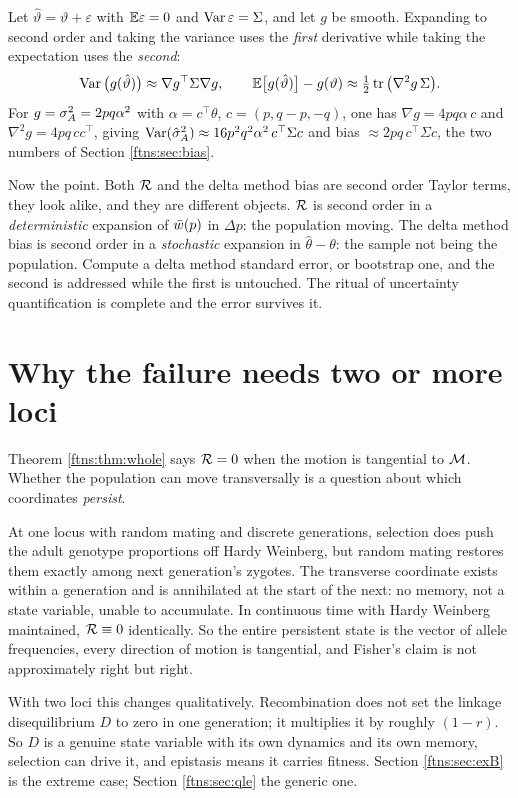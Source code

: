 Let $\hat\vartheta=\vartheta+\varepsilon$ with $\mathbb{E}\varepsilon=0$ and $\operatorname{Var}\varepsilon=\Sigma$, and let
$g$ be smooth. Expanding to second order and taking the variance uses the \emph{first} derivative
while taking the expectation uses the \emph{second}:
\[
\operatorname{Var}\big(g(\hat\vartheta)\big)\approx\nabla g^\top \Sigma\nabla g,
\qquad
\mathbb{E}\big[g(\hat\vartheta)\big]-g(\vartheta)\approx\tfrac12\operatorname{tr}\big(\nabla^2g\,\Sigma\big).
\]
For $g=\sigma^{2}_{A}=2pq\alpha^2$ with $\alpha=c^\top\theta$, $c=(p,q-p,-q)$, one has $\nabla g=4pq\alpha\,c$
and $\nabla^2g=4pq\,cc^\top$, giving $\operatorname{Var}(\hat\sigma^2_A)\approx16p^2q^2\alpha^2\,c^\top\Sigma c$ and
bias $\approx2pq\,c^\top\Sigma c$, the two numbers of Section \ref{ftns:sec:bias}.

Now the point. Both $\mathcal{R}$ and the delta method bias are second order Taylor terms, they look alike,
and they are different objects. $\mathcal{R}$ is second order in a \emph{deterministic} expansion of
$\bar{w}(p)$ in $\Delta p$: the population moving. The delta method bias is second order in a
\emph{stochastic} expansion in $\hat\theta-\theta$: the sample not being the population. Compute a
delta method standard error, or bootstrap one, and the second is addressed while the first is
untouched. The ritual of uncertainty quantification is complete and the error survives it.

\section{Why the failure needs two or more loci}
\label{ftns:sec:twoloci}

Theorem \ref{ftns:thm:whole} says $\mathcal{R}=0$ when the motion is tangential to $\mathcal{M}$. Whether the population
can move transversally is a question about which coordinates \emph{persist}.

At one locus with random mating and discrete generations, selection does push the adult genotype
proportions off Hardy Weinberg, but random mating restores them exactly among next generation's
zygotes. The transverse coordinate exists within a generation and is annihilated at the start of
the next: no memory, not a state variable, unable to accumulate. In continuous time with
Hardy Weinberg maintained, $\mathcal{R}\equiv0$ identically. So the entire persistent state is the vector
of allele frequencies, every direction of motion is tangential, and Fisher's claim is not
approximately right but right.

With two loci this changes qualitatively. Recombination does not set the linkage disequilibrium $D$
to zero in one generation; it multiplies it by roughly $(1-r)$. So $D$ is a genuine state variable
with its own dynamics and its own memory, selection can drive it, and epistasis means it carries
fitness. Section \ref{ftns:sec:exB} is the extreme case; Section \ref{ftns:sec:qle} the generic one.

